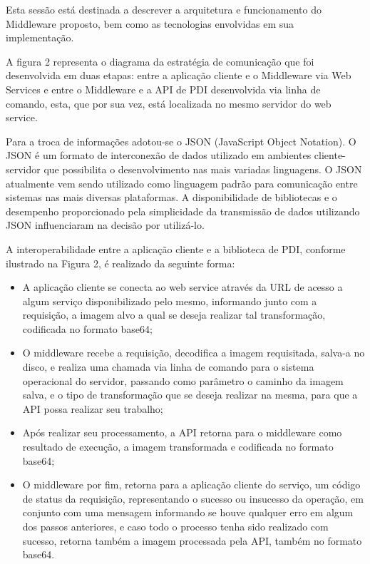 \documentclass[12pt]{article}
\begin{document}
Esta sessão está destinada a descrever a arquitetura e funcionamento do Middleware proposto, bem como as tecnologias envolvidas em sua implementação.


A figura 2 representa o diagrama da estratégia de comunicação que
foi desenvolvida em duas etapas: entre a aplicação cliente e o Middleware via Web Services e entre
o Middleware e a API de PDI desenvolvida via linha de comando, esta, que por sua vez, está localizada no mesmo servidor do web service.

Para a troca de informações adotou-se o JSON (JavaScript Object Notation). O
JSON é um formato de interconexão de dados utilizado em ambientes cliente-servidor
que possibilita o desenvolvimento nas mais variadas linguagens. O JSON atualmente
vem sendo utilizado como linguagem padrão para comunicação entre sistemas nas mais
diversas plataformas. A disponibilidade de bibliotecas e o desempenho proporcionado
pela simplicidade da transmissão de dados utilizando JSON influenciaram na decisão
por utilizá-lo.

A interoperabilidade entre a aplicação cliente e a biblioteca de PDI, conforme ilustrado na Figura 2, é
realizado da seguinte forma:
\begin{itemize}
	\item A aplicação cliente se conecta ao web service através da URL de acesso a algum serviço disponibilizado pelo mesmo, informando junto com a requisição, a imagem alvo a qual se deseja realizar tal transformação, codificada no formato base64;
	\item O middleware recebe a requisição, decodifica a imagem requisitada, salva-a no disco, e realiza uma chamada via linha de comando para o sistema operacional do servidor, passando como parâmetro o caminho da imagem salva, e o tipo de transformação que se deseja realizar na mesma, para que a API possa realizar seu trabalho;
	\item Após realizar seu processamento, a API retorna para o middleware como resultado de execução, a imagem transformada e codificada no formato base64;
	\item O middleware por fim, retorna para a aplicação cliente do serviço, um código de status da requisição, representando o sucesso ou insucesso da operação, em conjunto com uma mensagem informando se houve qualquer erro em algum dos passos anteriores, e caso todo o processo tenha sido realizado com sucesso, retorna também a imagem processada pela API, também no formato base64.
\end{itemize}
\end{document}
